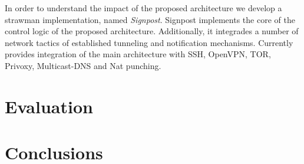 In order to understand the impact of the proposed architecture we develop a
strawman implementation, named {\it Signpost}. Signpost implements the core of
the control logic of the proposed architecture. Additionally, it integrades a
number of network tactics of established tunneling and notification mechanisms.
Currently \signpost provides integration of the main architecture with SSH, OpenVPN,
TOR, Privoxy, Multicast-DNS and Nat punching. 


\section{Evaluation}\label{sec:signpost-evaluation}

\section{Conclusions}\label{sec:signpost-conclusion}
%
%
%


